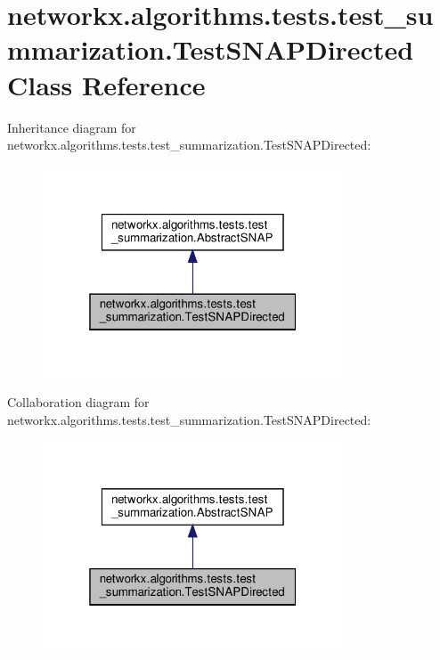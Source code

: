 \hypertarget{classnetworkx_1_1algorithms_1_1tests_1_1test__summarization_1_1TestSNAPDirected}{}\section{networkx.\+algorithms.\+tests.\+test\+\_\+summarization.\+Test\+S\+N\+A\+P\+Directed Class Reference}
\label{classnetworkx_1_1algorithms_1_1tests_1_1test__summarization_1_1TestSNAPDirected}


Inheritance diagram for networkx.\+algorithms.\+tests.\+test\+\_\+summarization.\+Test\+S\+N\+A\+P\+Directed\+:
\nopagebreak
\begin{figure}[H]
\begin{center}
\leavevmode
\includegraphics[width=253pt]{classnetworkx_1_1algorithms_1_1tests_1_1test__summarization_1_1TestSNAPDirected__inherit__graph}
\end{center}
\end{figure}


Collaboration diagram for networkx.\+algorithms.\+tests.\+test\+\_\+summarization.\+Test\+S\+N\+A\+P\+Directed\+:
\nopagebreak
\begin{figure}[H]
\begin{center}
\leavevmode
\includegraphics[width=253pt]{classnetworkx_1_1algorithms_1_1tests_1_1test__summarization_1_1TestSNAPDirected__coll__graph}
\end{center}
\end{figure}
